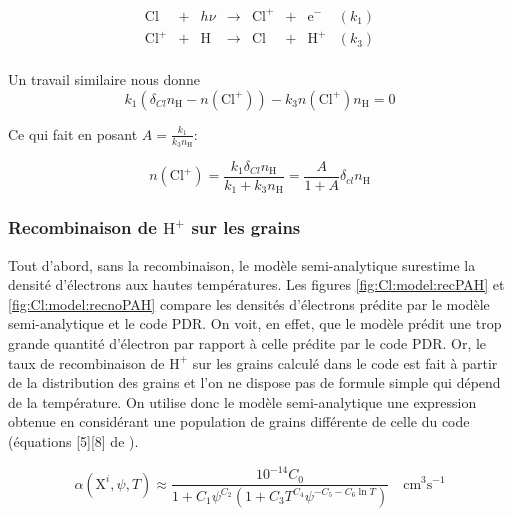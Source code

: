 \begin{equation}
    \begin{array}{lccccclr}
       \mathrm{Cl}  & + & h\nu & \rightarrow & \mathrm{Cl}^+ & + & \mathrm{e}^- & (k_1) \\
        \mathrm{Cl}^+ & + &\mathrm{H}   & \rightarrow &\mathrm{Cl}  & + & \mathrm{H}^+ & (k_3) \\
    \end{array}
\end{equation}

Un travail similaire nous donne 
\begin{equation}
    k_1(\delta_{Cl}n_{\mathrm{H}} - n(\mathrm{Cl}^+)) - k_3 n(\mathrm{Cl}^+) n_{\mathrm{H}} = 0
\end{equation}

Ce qui fait en posant $A = \frac{k_1}{k_3 n_{\mathrm{H}}}$:

\begin{equation}
\boxed{n(\mathrm{Cl}^+) = \frac{k_1 \delta_{Cl} n_{\mathrm{H}}}{k_1 + k_3 n_{\mathrm{H}}} = \frac{A}{1 + A} \delta_{cl} n_{\mathrm{H}}}
\end{equation}



\subsubsection{Recombinaison de $\mathrm{H}^+$ sur les grains}

Tout d'abord, sans la recombinaison, le modèle semi-analytique surestime la densité d'électrons aux hautes températures. Les figures \ref{fig:Cl:model:recPAH} et \ref{fig:Cl:model:recnoPAH} compare les densités d'électrons prédite par le modèle semi-analytique et le code PDR. On voit, en effet, que le modèle prédit une trop grande quantité d'électron par rapport à celle prédite par le code PDR. Or, le taux de recombinaison de $\mathrm{H}^+$ sur les grains calculé dans le code est fait à partir de la distribution des grains et l'on ne dispose pas de formule simple qui dépend de la température. On utilise donc le modèle semi-analytique une expression obtenue en considérant une population de grains différente de celle du code (équations [5][8] de \cite{Weingartner_2001}). 

\begin{equation}
    \alpha \left(\mathrm{X}^{i}, \psi, T\right) \approx \frac{10^{-14} C_{0} }{1+C_{1} \psi^{C_{2}}\left(1+C_{3} T^{C_{4}} \psi^{-C_{5}-C_{6} \ln T}\right)} \quad \mathrm{cm}^{3} \mathrm{s}^{-1}
\end{equation}

